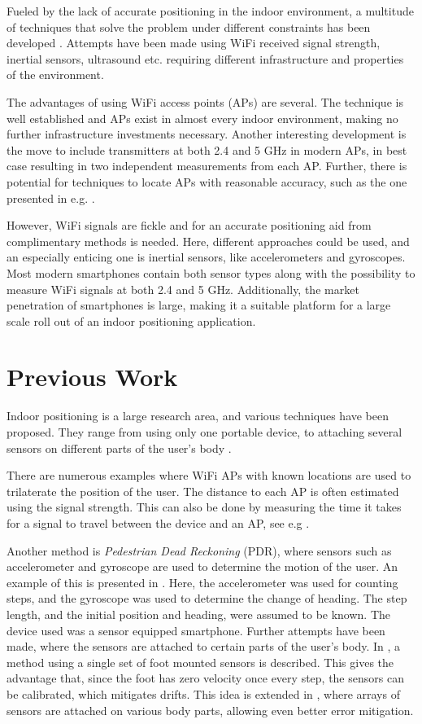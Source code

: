 \documentclass{LTHthesis}
\begin{document}
Fueled by the lack of accurate positioning in the indoor environment, a multitude of techniques that solve the problem under different constraints has been developed \cite{positioning_overview}. Attempts have been made using WiFi received signal strength, inertial sensors, ultrasound etc. requiring different infrastructure and properties of the environment. 

The advantages of using WiFi access points (APs) are several. The technique is well established and APs exist in almost every indoor environment, making no further infrastructure investments necessary. Another interesting development is the move to include transmitters at both 2.4 and 5 GHz in modern APs, in best case resulting in two independent measurements from each AP. Further, there is potential for techniques to locate APs with reasonable accuracy, such as the one presented in e.g. \cite{exjobb}. 

However, WiFi signals are fickle and for an accurate positioning aid from complimentary methods is needed. Here, different approaches could be used, and an especially enticing one is inertial sensors, like accelerometers and gyroscopes. Most modern smartphones contain both sensor types along with the possibility to measure WiFi signals at both 2.4 and 5 GHz. Additionally, the market penetration of smartphones is large, making it a suitable platform for a large scale roll out of an indoor positioning application.
%

\section{Previous Work}
Indoor positioning is a large research area, and various techniques have been proposed. They range from using only one portable device, to attaching several sensors on different parts of the user's body \cite{body_mounted}.

There are numerous examples where WiFi APs with known locations are used to trilaterate the position of the user. The distance to each AP is often estimated using the signal strength. This can also be done by measuring the time it takes for a signal to travel between the device and an AP, see e.g \cite{wlan_pos}.

Another method is \emph{Pedestrian Dead Reckoning} (PDR), where sensors such as accelerometer and gyroscope are used to determine the motion of the user. An example of this is presented in \cite{exjobb}. Here, the accelerometer was used for counting steps, and the gyroscope was used to determine the change of heading. The step length, and the initial position and heading, were assumed to be known. The device used was a sensor equipped smartphone. Further attempts have been made, where the sensors are attached to certain parts of the user's body. In \cite{foot_mounted}, a method using a single set of foot mounted sensors is described. This gives the advantage that, since the foot has zero velocity once every step, the sensors can be calibrated, which mitigates drifts. This idea is extended in \cite{body_mounted}, where arrays of sensors are attached on various body parts, allowing even better error mitigation.
\end{document}
